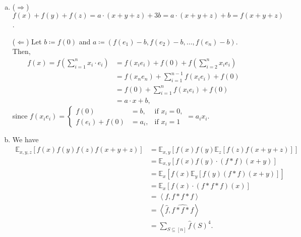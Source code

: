 \documentclass[12pt]{article}
\newcommand{\E}[2]{\mathbb E_{#1}\left[#2\right]}
\newcommand{\sumS}{\sum_{S \subseteq [n]}}
\renewcommand{\ip}[1]{\left\langle#1\right\rangle}
\begin{document}
\subsection{}

\subsection{}

\subsection{}

\subsection{}
\begin{enumerate}[(a)]
    \item ($\Longrightarrow$) $f(x) + f(y) + f(z) = a \cdot (x + y + z) + 3b = a \cdot (x + y + z) + b = f(x+y+z)$.
    
    ($\Longleftarrow$) Let $b \coloneqq f(0)$ and $a \coloneqq (f(e_1) - b, f(e_2) - b, \ldots, f(e_n) - b)$. Then,
    \begin{align*}
    f(x) = f\left(\sum_{i = 1}^n x_i \cdot e_i\right) &= f(x_i e_i) + f(0) + f\left(\sum_{i = 2}^n x_i e_i\right)\\
    &= f(x_n e_n) + \sum_{i = 1}^{n-1} f(x_i e_i) + f(0)\\
    &= f(0) + \sum_{i = 1}^{n} f(x_i e_i) + f(0)\\
    &= a \cdot x + b,
    \end{align*}
    since $f(x_i e_i) = \left\{\begin{array}{lll}f(0) &= b, &\text{if } x_i = 0,\\f(e_i) + f(0) &= a_i, &\text{if } x_i = 1\end{array}\right. = a_i x_i$.
    
    \item We have
    \begin{align*}
        \E{x,y,z}{f(x)f(y)f(z)f(x+y+z)} &= \E{x,y}{f(x)f(y)\E{z}{f(z)f(x+y+z)}}\\
        &= \E{x,y}{f(x) f(y) \cdot (f * f)(x+y)}\\
        &= \E{x}{f(x) \E{y}{f(y) (f * f)(x+y)}}\\
        &= \E{x}{f(x) \cdot (f * f * f)(x)}\\
        &= \ip{f, f * f * f}\\
        &= \ip{\hat{f}, \widehat{f * f * f}}\\
        &= \sumS \hat{f}(S)^4.
    \end{align*}
    

\end{enumerate}
\end{document}
